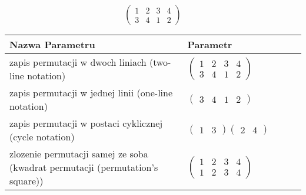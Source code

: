 \documentclass[12pt]{article}
\begin{document}
\subsection{}
\begin{center}
\[
\begin{pmatrix}
	1 & 2 & 3 & 4 \\ 
	3 & 4 & 1 & 2 
\end{pmatrix}
\]

\begin{tabular}{|m{0.6\linewidth}|m{0.4\linewidth}|}
	\hline
	Nazwa Parametru & Parametr \\
	\hline
	zapis permutacji w dwoch liniach (two-line notation) & $\begin{pmatrix} 1 & 2 & 3 & 4 \\ 
3 & 4 & 1 & 2 \end{pmatrix}$ \\ 
	\hline
	zapis permutacji w jednej linii (one-line notation) & $\begin{pmatrix} 3 & 4 & 1 & 2 \end{pmatrix}$ \\ 
	\hline
	zapis permutacji w postaci cyklicznej (cycle notation) & $\begin{pmatrix} 1 & 3 \end{pmatrix} \begin{pmatrix} 2 & 4 \end{pmatrix} $ \\ 
	\hline
	zlozenie permutacji samej ze soba (kwadrat permutacji (permutation's square)) & $\begin{pmatrix} 1 & 2 & 3 & 4 \\ 
1 & 2 & 3 & 4 \end{pmatrix}$ \\ 
	\hline
\end{tabular}
\end{center}
\end{document}
